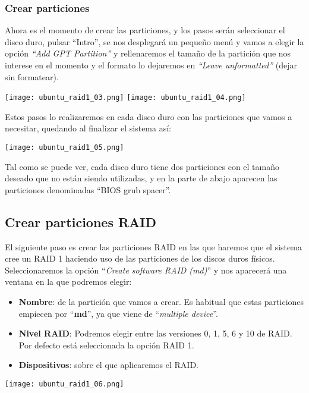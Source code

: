 \subsubsection{Crear particiones}
Ahora es el momento de crear las particiones, y los pasos serán seleccionar el disco duro, pulsar “Intro”, se nos desplegará un pequeño menú y vamos a elegir la opción  \textit{“Add GPT Partition”} y rellenaremos el tamaño de la partición que nos interese en el momento y el formato lo dejaremos en \textit{“Leave unformatted”} (dejar sin formatear).

\begin{center}
    \texttt{[image: ubuntu\_raid1\_03.png]}
    \hfill
    \texttt{[image: ubuntu\_raid1\_04.png]}
\end{center}

Estos pasos lo realizaremos en cada disco duro con las particiones que vamos a necesitar, quedando al finalizar el sistema así:

\begin{center}
    \texttt{[image: ubuntu\_raid1\_05.png]}
\end{center}

Tal como se puede ver, cada disco duro tiene dos particiones con el tamaño deseado que no están siendo utilizadas, y en la parte de abajo aparecen las particiones denominadas “BIOS grub spacer”.


\subsection{Crear particiones RAID}
El siguiente paso es crear las particiones RAID en las que haremos que el sistema cree un RAID 1 haciendo uso de las particiones de los discos duros físicos. Seleccionaremos la opción “\textit{Create software RAID (md)}” y nos aparecerá una ventana en la que podremos elegir:

{
    \begin{minipage}{9cm}
        \begin{itemize}
            \item \textbf{Nombre}: de la partición que vamos a crear. Es habitual que estas particiones empiecen por “\textbf{md}”, ya que viene de “\textit{multiple device}”.
            \item \textbf{Nivel RAID}: Podremos elegir entre las versiones 0, 1, 5, 6 y 10 de RAID. Por defecto está seleccionada la opción RAID 1.
            \item  \textbf{Dispositivos}: sobre el que aplicaremos el RAID.
        \end{itemize}
    \end{minipage}
    \hfill
    \begin{minipage}{7cm}
        \texttt{[image: ubuntu\_raid1\_06.png]}
    \end{minipage}
}


